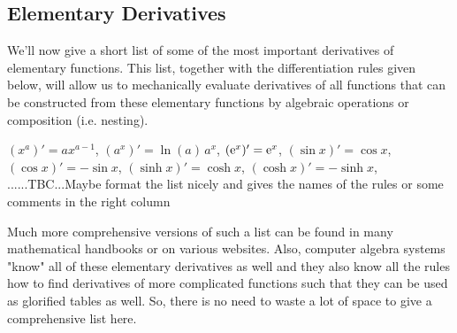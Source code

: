 

\subsection{Elementary Derivatives}
We'll now give a short list of some of the most important derivatives of elementary functions. This list, together with the differentiation rules given below, will allow us to mechanically evaluate derivatives of all functions that can be constructed from these elementary functions by algebraic operations or composition (i.e. nesting). 

\medskip
$(x^a)' = a x^{a-1}$, $(a^x)' = \ln(a) \, a^x$, $(\operatorname{\mathrm{e}}^x)' = \operatorname{\mathrm{e}}^x$, $(\sin x)' = \cos x$, $(\cos x)' = -\sin x$, $(\sinh x)' = \cosh x$, $(\cosh x)' = -\sinh x$, ......TBC...Maybe format the list nicely and gives the names of the rules or some comments in the right column


\medskip
Much more comprehensive versions of such a list can be found in many mathematical handbooks or on various websites. Also, computer algebra systems "know" all of these elementary derivatives as well and they also know all the rules how to find derivatives of more complicated functions such that they can be used as glorified tables as well. So, there is no need to waste a lot of space to give a comprehensive list here.





